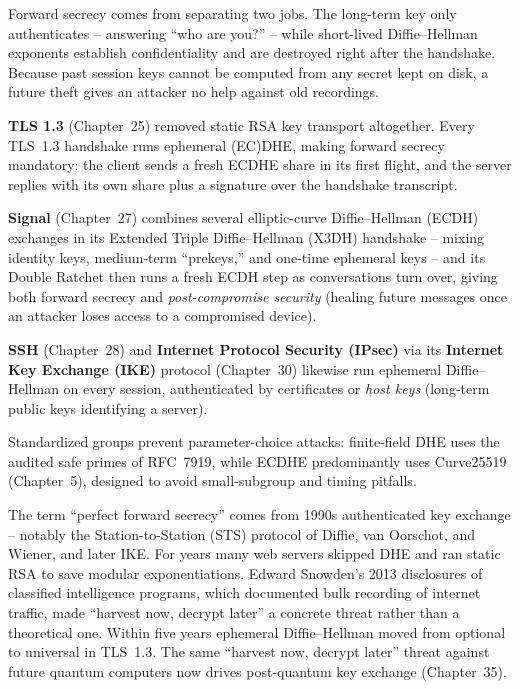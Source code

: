 \begin{whybox}
Forward secrecy comes from separating two jobs. The long-term key only authenticates -- answering ``who are you?'' -- while short-lived Diffie--Hellman exponents establish confidentiality and are destroyed right after the handshake. Because past session keys cannot be computed from any secret kept on disk, a future theft gives an attacker no help against old recordings.
\end{whybox}

\begin{applicationbox}
\textbf{TLS 1.3} (Chapter~25) removed static RSA key transport altogether. Every TLS~1.3 handshake runs ephemeral (EC)DHE, making forward secrecy mandatory: the client sends a fresh ECDHE share in its first flight, and the server replies with its own share plus a signature over the handshake transcript.

\textbf{Signal} (Chapter~27) combines several elliptic-curve Diffie--Hellman (ECDH) exchanges in its Extended Triple Diffie--Hellman (X3DH) handshake -- mixing identity keys, medium-term ``prekeys,'' and one-time ephemeral keys -- and its Double Ratchet then runs a fresh ECDH step as conversations turn over, giving both forward secrecy and \emph{post-compromise security} (healing future messages once an attacker loses access to a compromised device).

\textbf{SSH} (Chapter~28) and \textbf{Internet Protocol Security (IPsec)} via its \textbf{Internet Key Exchange (IKE)} protocol (Chapter~30) likewise run ephemeral Diffie--Hellman on every session, authenticated by certificates or \emph{host keys} (long-term public keys identifying a server).

Standardized groups prevent parameter-choice attacks: finite-field DHE uses the audited safe primes of RFC~7919, while ECDHE predominantly uses Curve25519 (Chapter~5), designed to avoid small-subgroup and timing pitfalls.
\end{applicationbox}

\begin{connectionbox}
The term ``perfect forward secrecy'' comes from 1990s authenticated key exchange -- notably the Station-to-Station (STS) protocol of Diffie, van Oorschot, and Wiener, and later IKE. For years many web servers skipped DHE and ran static RSA to save modular exponentiations. Edward Snowden's 2013 disclosures of classified intelligence programs, which documented bulk recording of internet traffic, made ``harvest now, decrypt later'' a concrete threat rather than a theoretical one. Within five years ephemeral Diffie--Hellman moved from optional to universal in TLS~1.3. The same ``harvest now, decrypt later'' threat against future quantum computers now drives post-quantum key exchange (Chapter~35).
\end{connectionbox}

